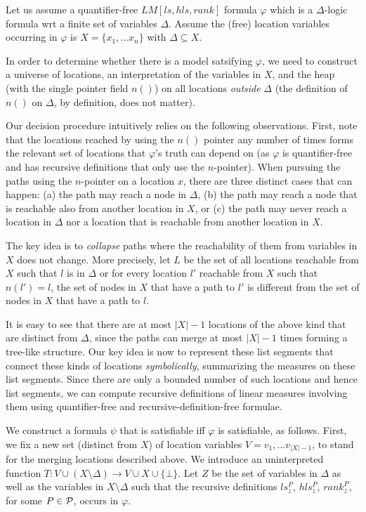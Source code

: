 Let us assume a quantifier-free $LM[ls,hls,rank]$ formula $\varphi$ which is a $\Delta$-logic formula
wrt a finite set of variables $\Delta$.
Assume the (free) location variables occurring in $\varphi$ is $X = \{x_1, \ldots x_n\}$ with
$\Delta \subseteq X$. 

In order to determine whether there is a model satsifying $\varphi$, we need to construct a universe
of locations, an interpretation of the variables in $X$, and the heap
(with the single pointer field $n()$) on all locations \emph{outside} $\Delta$ (the definition
of $n()$ on $\Delta$, by definition, does not matter).

Our decision procedure intuitively relies on the following observations. First, note that the locations
reached by using the $n()$ pointer any number of times forms the relevant set of locations that $\varphi$'s
truth can depend on (as $\varphi$ is quantifier-free and has recursive definitions that only use the $n$-pointer).
When pursuing the paths using the $n$-pointer on a location $x$, there are three distinct cases that can happen:
(a) the path may reach a node in $\Delta$, (b) the path may reach a node that is reachable also from another location in $X$,
or (c) the path may never reach a location in $\Delta$ nor a location that is reachable from another location in $X$. 

The key idea is to \emph{collapse} paths where the reachability of them from variables in $X$ does not change.
More precisely, let $L$ be the set of all locations reachable from $X$ such that $l$ is in $\Delta$ or 
for every location $l'$ reachable from $X$ such that $n(l')=l$, the set of nodes in $X$ that have a path
to $l'$ is different from the set of nodes in $X$ that have a path to $l$.

It is easy to see that there are at most $|X|-1$ locations of the above kind that are distinct from $\Delta$,
since the paths can merge at most $|X|-1$ times forming a tree-like structure. Our key idea is now to 
represent these list segments that connect these kinds of locations \emph{symbolically}, summarizing the 
measures on these list segments. Since there are only a bounded number of such locations and hence list
segments, we can compute recursive definitions of linear measures involving them using quantifier-free
and recursive-definition-free formulae.

We construct a formula $\psi$ that is satisfiable iff $\varphi$ is satisfiable, as follows.
First, we fix a new set (distinct from $X$) of location variables $V={v_1, \ldots v_{|X|-1}}$,
to stand for the merging locations described above.
We introduce an uninterpreted function $T: V \cup (X\setminus \Delta) \longrightarrow V \cup X \cup \{\bot\}$.
Let $Z$ be the set of variables in $\Delta$ as well as the variables in $X \setminus \Delta$ 
such that the recursive definitions $ls_z^P$, $hls_z^P$, $rank_z^P$, for some
$P \in {\cal P}$, occurs in $\varphi$.

